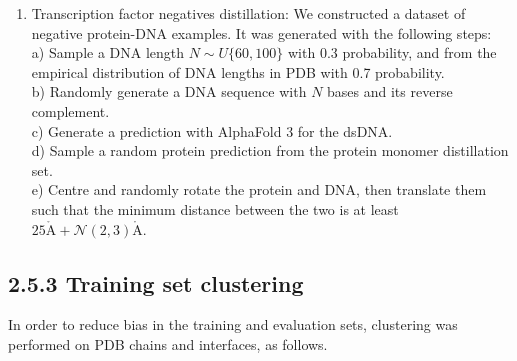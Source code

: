 \documentclass[10pt]{article}
\def\AA{\mathring{\mathrm{A}}}
\begin{document}
\begin{enumerate}
e) Align the last base pairs of one of the random helices to the first base pair in the original prediction, and align the first base pair in the other random helix to the last base pair in the original prediction.\\
f) If the new extended structure has any new clashes or violations, then we return the original structure without modifications. A clash is defined as having two heavy atoms within $1.5 \AA$, excluding neighbouring residues. A violation is defined if the bond angle differs by more than 20 degrees to the RDKit reference conformer, or if the bond lengths differ by more than $0.2 \AA$ to the reference conformer.
  \item Transcription factor negatives distillation: We constructed a dataset of negative protein-DNA examples. It was generated with the following steps:\\
a) Sample a DNA length $N \sim U\{60,100\}$ with 0.3 probability, and from the empirical distribution of DNA lengths in PDB with 0.7 probability.\\
b) Randomly generate a DNA sequence with $N$ bases and its reverse complement.\\
c) Generate a prediction with AlphaFold 3 for the dsDNA.\\
d) Sample a random protein prediction from the protein monomer distillation set.\\
e) Centre and randomly rotate the protein and DNA, then translate them such that the minimum distance between the two is at least $25 \AA+\mathcal{N}(2,3) \AA$.
\end{enumerate}

\subsection*{2.5.3 Training set clustering}
In order to reduce bias in the training and evaluation sets, clustering was performed on PDB chains and interfaces, as follows.
\end{document}

